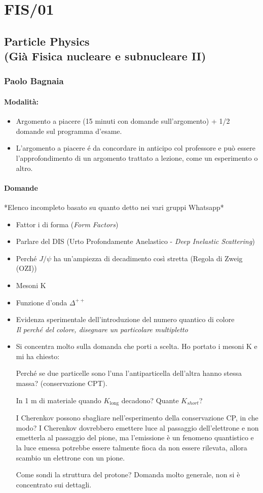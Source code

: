 \documentclass[../main.tex]{subfiles}
\begin{document}
\section{FIS/01}
\subsection{Particle Physics\\(Già Fisica nucleare e subnucleare II)}
\subsubsection{Paolo Bagnaia}
\paragraph{Modalità:}
\begin{itemize}
    \item Argomento a piacere (15 minuti con domande sull'argomento) + 1/2 domande sul programma d'esame.
    \item L'argomento a piacere é da concordare in anticipo col professore e può essere l'approfondimento di un argomento trattato a lezione, come un esperimento o altro.
\end{itemize}
\paragraph{Domande}
*Elenco incompleto basato su quanto detto nei vari gruppi Whatsapp*
\begin{itemize}
    \item Fattor i di forma (\textit{Form Factors})
    \item Parlare del DIS (Urto Profondamente Anelastico - \textit{Deep Inelastic Scattering})
    \item Perché $J/\psi$ ha un'ampiezza di decadimento così stretta (Regola di Zweig (OZI))
    \item Mesoni K
    \item Funzione d'onda $\Delta^{++}$
    \item Evidenza sperimentale dell'introduzione del numero quantico di colore\\
    \textit{Il perché del colore, disegnare un particolare multipletto}
    \item Si concentra molto sulla domanda che porti a scelta. Ho portato i mesoni K e mi ha chiesto: 

Perché se due particelle sono l'una l'antiparticella dell'altra hanno stessa massa? (conservazione CPT). 

In 1 m di materiale quando $K_{\text{long}}$ decadono? Quante $K_{short}$?

I Cherenkov possono sbagliare nell'esperimento della conservazione CP, in che modo? I Cherenkov dovrebbero emettere luce al passaggio dell'elettrone e non emetterla al passaggio del pione, ma l'emissione è un fenomeno quantistico e la luce emessa potrebbe essere talmente fioca da non essere rilevata, allora scambio un elettrone con un pione.

Come sondi la struttura del protone? Domanda molto generale, non si è concentrato sui dettagli.
\end{itemize}
\end{document}
